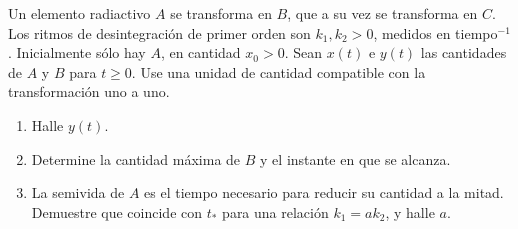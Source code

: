 Un elemento radiactivo $A$ se transforma en $B$, que a su vez se transforma en $C$. Los ritmos de desintegración de primer orden son $k_1,k_2>0$, medidos en tiempo$^{-1}$. Inicialmente sólo hay $A$, en cantidad $x_0>0$. Sean $x(t)$ e $y(t)$ las cantidades de $A$ y $B$ para $t\ge0$. Use una unidad de cantidad compatible con la transformación uno a uno.

\begin{enumerate}[label=(\alph*),ref=\alph*,leftmargin=*]
\item Halle $y(t)$.
\item Determine la cantidad máxima de $B$ y el instante en que se alcanza.
\item La semivida de $A$ es el tiempo necesario para reducir su cantidad a la mitad. Demuestre que coincide con $t_*$ para una relación $k_1=ak_2$, y halle $a$.
\end{enumerate}
